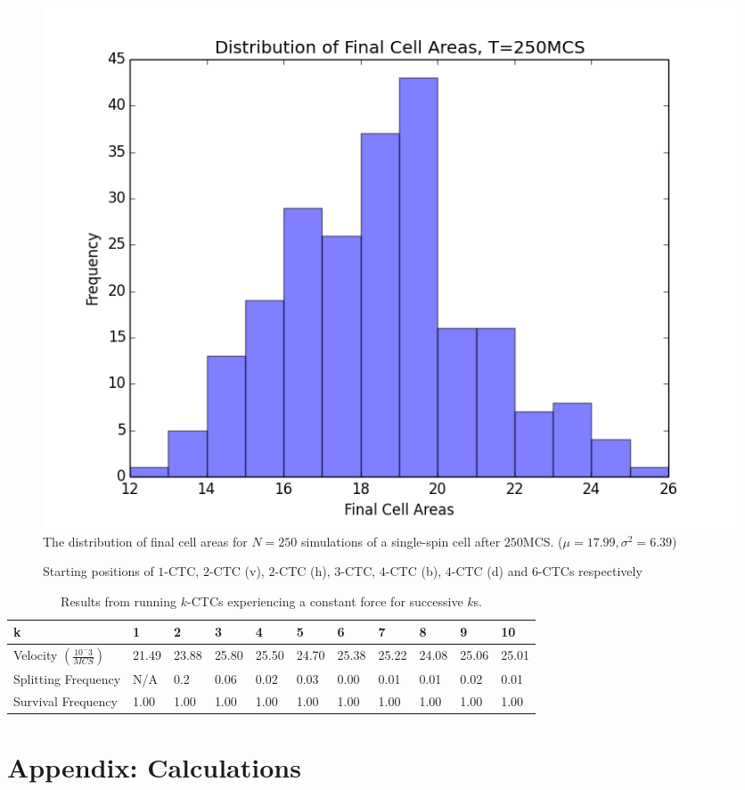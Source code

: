 \documentclass[12pt]{article}
\begin{document}
\begin{figure}[h]
	\centering
	\includegraphics[scale=0.5]{img/cellareas}
	\caption{The distribution of final cell areas for $N=250$ simulations of a single-spin cell after $250$MCS. ($\mu = 17.99, \sigma^2=6.39$) }
	\label{cellareas}
\end{figure}

\begin{figure}[h]
	\centering
	\caption{Starting positions of $1$-CTC, $2$-CTC (v), $2$-CTC (h), $3$-CTC, $4$-CTC (b), $4$-CTC (d) and $6$-CTCs respectively}
	\label{race_start}
\end{figure}

\begin{table}[h]
	\begin{tabular}{|l|l|l|l|l|l|l|l|l|l|l|}
	\hline
	k                                                                             & 1     & 2     & 3     & 4     & 5     & 6     & 7     & 8     & 9     & 10    \\ \hline
	Velocity $(\frac{10^-3}{MCS})$ & 21.49 & 23.88 & 25.80 & 25.50 & 24.70 & 25.38 & 25.22 & 24.08 & 25.06 & 25.01 \\ \hline
	Splitting Frequency                                                           & N/A   & 0.2   & 0.06  & 0.02  & 0.03  & 0.00  & 0.01  & 0.01  & 0.02  & 0.01  \\ \hline
	Survival Frequency                                                            & 1.00  & 1.00  & 1.00  & 1.00  & 1.00  & 1.00  & 1.00  & 1.00  & 1.00  & 1.00 \\ \hline
	\end{tabular}
	\caption{Results from running $k$-CTCs experiencing a constant force for successive $k$s.}
	\label{racestats}
\end{table}

\newpage




\section{Appendix: Calculations}
\end{document}
